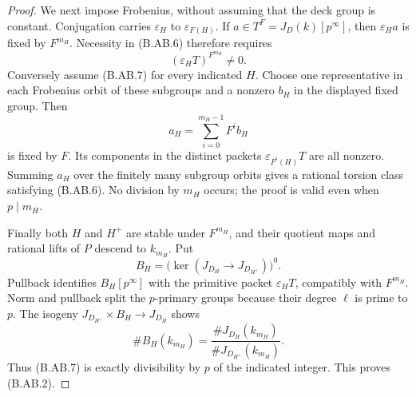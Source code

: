 \documentclass[11pt,a4paper]{article}
\begin{document}
\begin{proof}
We next impose Frobenius, without assuming that the deck group
is constant. Conjugation carries $\varepsilon_H$ to
$\varepsilon_{F(H)}$. If $a\in T^F=J_D(k)[p^\infty]$,
then $\varepsilon_Ha$ is fixed by $F^{m_H}$. Necessity in
(B.AB.6) therefore requires
\[
                         (\varepsilon_HT)^{F^{m_H}}\ne0.        \tag{B.AB.7}
\]
Conversely assume (B.AB.7) for every indicated $H$.
Choose one representative in each Frobenius orbit of these
subgroups and a nonzero $b_H$ in the displayed fixed group.
Then
\[
                  a_H=\sum_{i=0}^{m_H-1}F^i b_H
\]
is fixed by $F$. Its components in the distinct packets
$\varepsilon_{F^i(H)}T$ are all nonzero. Summing $a_H$ over
the finitely many subgroup orbits gives a rational torsion
class satisfying (B.AB.6). No division by $m_H$ occurs;
the proof is valid even when $p\mid m_H$.

Finally both $H$ and $H^+$ are stable under $F^{m_H}$, and
their quotient maps and rational lifts of $P$ descend to
$k_{m_H}$. Put
\[
 B_H=\bigl(\ker(J_{D_H}\longrightarrow J_{D_{H^+}})\bigr)^0.
\]
Pullback identifies $B_H[p^\infty]$ with the primitive packet
$\varepsilon_HT$, compatibly with $F^{m_H}$. Norm and
pullback split the $p$-primary groups because their degree
$\ell$ is prime to $p$. The isogeny
$J_{D_{H^+}}\times B_H\to J_{D_H}$ shows
\[
 \#B_H(k_{m_H})
       =\frac{\#J_{D_H}(k_{m_H})}{\#J_{D_{H^+}}(k_{m_H})}.
\]
Thus (B.AB.7) is exactly divisibility by $p$ of the indicated
integer. This proves (B.AB.2).
\end{proof}
\end{document}
